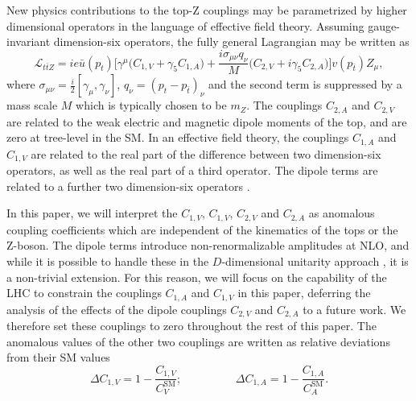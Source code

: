 \documentclass[preprint]{JHEP3} %
\newcommand{\mrm}{\mathrm}
\def\ttbZ{t\bar{t}Z}
\def\ConeA{C_{1,A}}
\def\ConeV{C_{1,V}}
\def\CtwoA{C_{2,A}}
\def\CtwoV{C_{2,V}}
\def\ConeVSM{C_{V}^{\mrm{SM}}}
\def\ConeASM{C_{A}^{\mrm{SM}}}
\def\DConeA{\Delta C_{1,A}}
\def\DConeV{\Delta C_{1,V}}
\begin{document}
New physics contributions to the top-Z couplings may be parametrized by higher dimensional operators in the language of effective field theory. Assuming gauge-invariant dimension-six operators, the fully general Lagrangian may be written as \cite{AlcarazMaestre:2012vp,0811.3842}
\begin{equation} \label{L_NP}
\mathcal{L}_{\ttbZ} = i e \bar{u}(p_t)\biggl[ \gamma^{\mu} \bigl(C_{1,V} + \gamma_5 C_{1,A} \bigr) + \frac{i \sigma_{\mu \nu} q_{\nu}}{M} \bigl(C_{2,V} + i\gamma_5 C_{2,A} \bigr) \biggr] v(p_{\bar{t}}) Z_{\mu},
\end{equation}
where $\sigma_{\mu \nu}=\frac{i}{2} [ \gamma_{\mu},\gamma_{\nu} ]$, $q_{\nu} = (p_{t}-p_{\bar{t}})_{\nu}$ and the second term is suppressed by a 
mass scale $M$ which is typically chosen to be $m_Z$. 
The couplings $C_{2,A}$ and $C_{2,V}$ are related to the weak electric and magnetic dipole moments of the top, and are zero at tree-level in the SM. 
In an effective field theory, the couplings $\ConeA$ and $\ConeV$ are related to the real part of the difference between two dimension-six operators, 
as well as the real part of a third operator. The dipole terms are related to a further two dimension-six operators \cite{}.

In this paper, we will interpret the $\ConeV$, $\ConeV$, $\CtwoV$ and $\CtwoA$ as anomalous coupling coefficients which are independent of the kinematics of 
the tops or the Z-boson. 
The dipole terms introduce non-renormalizable amplitudes at NLO, and while it is possible to handle these in the $D$-dimensional unitarity approach \cite{}, 
it is a non-trivial extension. For this reason, we will focus on the capability of the LHC to constrain the couplings $\ConeA$ and $\ConeV$ in this paper, 
deferring the analysis of the effects of the dipole couplings $\CtwoV$ and $\CtwoA$ to a future work. We therefore set these couplings to zero throughout 
the rest of this paper. The anomalous values of the other two couplings are written as relative deviations from their SM values
\begin{equation}
\DConeV =  1-\frac{\ConeV}{\ConeVSM} ; \hspace{2cm} \DConeA = 1-\frac{\ConeA}{\ConeASM}.
\end{equation}



\end{document}
